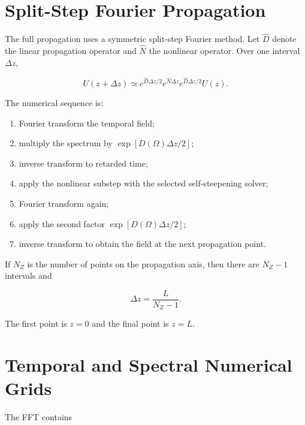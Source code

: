 \documentclass[11pt,a4paper]{article}
\begin{document}
\section{Split-Step Fourier Propagation}

The full propagation uses a symmetric split-step Fourier method. Let
$\widehat D$ denote the linear propagation operator and $\widehat N$ the
nonlinear operator. Over one interval $\Delta z$,

\begin{equation}
U(z+\Delta z)
\simeq
 e^{\widehat D\Delta z/2}
 e^{\widehat N\Delta z}
 e^{\widehat D\Delta z/2}
 U(z).
\end{equation}

The numerical sequence is:

\begin{enumerate}
    \item Fourier transform the temporal field;
    \item multiply the spectrum by $\exp[D(\Omega)\Delta z/2]$;
    \item inverse transform to retarded time;
    \item apply the nonlinear substep with the selected self-steepening solver;
    \item Fourier transform again;
    \item apply the second factor $\exp[D(\Omega)\Delta z/2]$;
    \item inverse transform to obtain the field at the next propagation point.
\end{enumerate}

If $N_Z$ is the number of points on the propagation axis, then there are
$N_Z-1$ intervals and

\begin{equation}
\boxed{
\Delta z=\frac{L}{N_Z-1}.
}
\end{equation}

The first point is $z=0$ and the final point is $z=L$.

\section{Temporal and Spectral Numerical Grids}

The FFT contains
\end{document}
